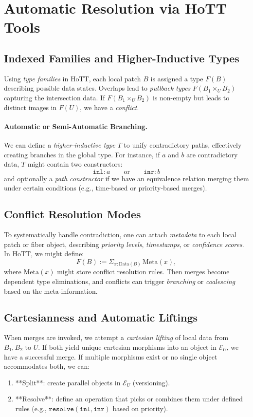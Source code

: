 \documentclass{article}
\begin{document}
\section{Automatic Resolution via HoTT Tools}
\label{sec:hott_resolution}

\subsection{Indexed Families and Higher-Inductive Types}

Using \emph{type families} in HoTT, each local patch $B$ is assigned a type $F(B)$ describing possible data states. Overlaps lead to \emph{pullback types} $F(B_1 \times_U B_2)$ capturing the intersection data. If $F(B_1 \times_U B_2)$ is non-empty but leads to distinct images in $F(U)$, we have a \emph{conflict}.

\paragraph{Automatic or Semi-Automatic Branching.}
We can define a \emph{higher-inductive type} $T$ to unify contradictory paths, effectively creating branches in the global type. For instance, if $a$ and $b$ are contradictory data, $T$ might contain two constructors:
\[
\mathtt{inl}: a \quad\quad \text{or} \quad\quad \mathtt{inr}: b
\]
and optionally a \emph{path constructor} if we have an equivalence relation merging them under certain conditions (e.g., time-based or priority-based merges).

\subsection{Conflict Resolution Modes}
To systematically handle contradiction, one can attach \emph{metadata} to each local patch or fiber object, describing \emph{priority levels}, \emph{timestamps}, or \emph{confidence scores}. In HoTT, we might define:
\[
F(B) := \Sigma_{x : \mathrm{Data}(B)}\, \mathrm{Meta}(x),
\]
where $\mathrm{Meta}(x)$ might store conflict resolution rules. Then merges become dependent type eliminations, and conflicts can trigger \emph{branching} or \emph{coalescing} based on the meta-information.

\subsection{Cartesianness and Automatic Liftings}
When merges are invoked, we attempt a \emph{cartesian lifting} of local data from $B_1, B_2$ to $U$. If both yield unique cartesian morphisms into an object in $\mathcal{E}_U$, we have a successful merge. If multiple morphisms exist or no single object accommodates both, we can:
\begin{enumerate}
    \item **Split**: create parallel objects in $\mathcal{E}_U$ (versioning).  
    \item **Resolve**: define an operation that picks or combines them under defined rules (e.g., $\mathtt{resolve}(\mathtt{inl},\mathtt{inr})$ based on priority).
\end{enumerate}
\end{document}
